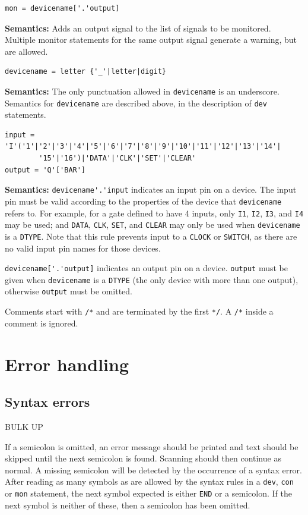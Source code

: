 \documentclass[a4paper,10pt]{article}
\begin{document}
\begin{verbatim}
mon = devicename['.'output]
\end{verbatim} 
\textbf{Semantics:} Adds an output signal to the list of signals to be monitored. Multiple monitor statements for the same output signal generate a warning, but are allowed.

\begin{verbatim}
devicename = letter {'_'|letter|digit}
\end{verbatim}
\textbf{Semantics:} The only punctuation allowed in \texttt{devicename} is an underscore. Semantics for \texttt{devicename} are described above, in the description of \texttt{dev} statements.

\begin{verbatim}
input = 'I'('1'|'2'|'3'|'4'|'5'|'6'|'7'|'8'|'9'|'10'|'11'|'12'|'13'|'14'|
        '15'|'16')|'DATA'|'CLK'|'SET'|'CLEAR'
output = 'Q'['BAR']
\end{verbatim} 

\textbf{Semantics:} \verb|devicename'.'input| indicates an input pin on a device. The input pin must be valid according to the properties of the device that \texttt{devicename} refers to. For example, for a gate defined to have 4 inputs, only \texttt{I1}, \texttt{I2}, \texttt{I3}, and \texttt{I4} may be used; and \texttt{DATA}, \texttt{CLK}, \texttt{SET}, and \texttt{CLEAR} may only be used when \texttt{devicename} is a \texttt{DTYPE}.
Note that this rule prevents input to a \texttt{CLOCK} or \texttt{SWITCH}, as there are no valid input pin names for those devices.

\verb|devicename['.'output]| indicates an output pin on a device. \texttt{output} must be given when \texttt{devicename} is a \texttt{DTYPE} (the only device with more than one output), otherwise \texttt{output} must be omitted. 

Comments start with \texttt{/*} and are terminated by the first \texttt{*/}. A \texttt{/*} inside a comment is ignored. 

\section{Error handling}

\subsection{Syntax errors}

BULK UP

If a semicolon is omitted, an error message should be printed and text should be skipped until the next semicolon is found. Scanning should then continue as normal. A missing semicolon will be detected by the occurrence of a syntax error. After reading as many symbols as are allowed by the syntax rules in a \texttt{dev}, \texttt{con} or \texttt{mon} statement, the next symbol expected is either \texttt{END} or a semicolon. If the next symbol is neither of these, then a semicolon has been omitted. 
\end{document}
